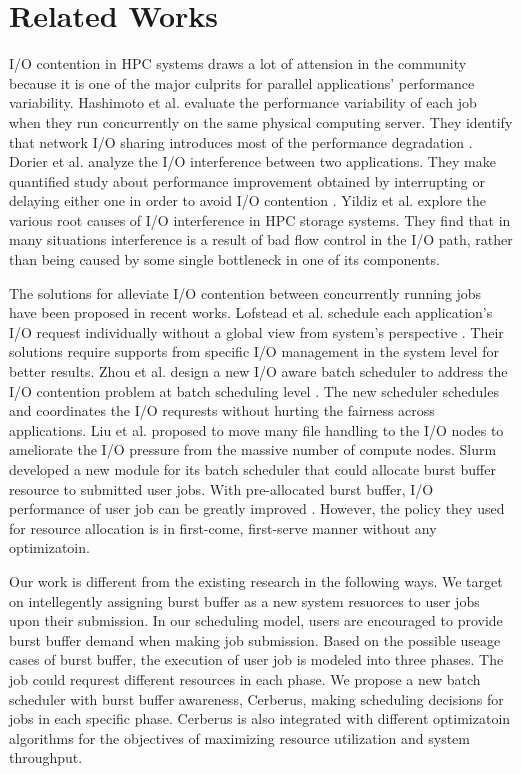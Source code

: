 \section{Related Works}
\label{Sec:RelatedWorks}

I/O contention in HPC systems draws a lot of attension in the community 
because it is one of the major culprits for parallel applications’ performance variability.
Hashimoto et al. evaluate the performance variability of each job 
when they run concurrently on the same physical computing server. 
They identify that network I/O sharing introduces most of 
the performance degradation \cite{hashimoto:ICNC:2012}.  
Dorier et al. analyze the I/O interference between two applications. 
They make quantified study about performance improvement obtained 
by interrupting or delaying either one in order to avoid I/O contention \cite{dorier:IPDPS:2014}.
Yildiz et al. \cite{yildiz:IPDPS:2016} explore the various root causes 
of I/O interference in HPC storage systems. 
They find that in many situations interference is a result of bad flow control in the I/O path, 
rather than being caused by some single bottleneck in one of its components.

The solutions for alleviate I/O contention between concurrently 
running jobs have been proposed in recent works.
Lofstead et al. schedule each application’s I/O request individually without 
a global view from system’s perspective \cite{lofstead:sc:2010}. 
Their solutions require supports from specific I/O management 
in the system level for better results. 
Zhou et al. design a new I/O aware batch scheduler to address the I/O 
contention problem at batch scheduling level \cite{zhou:Cluster:2015}. 
The new scheduler schedules and coordinates the 
I/O requrests without hurting the fairness across applications. 
Liu et al. proposed to move many file handling to the I/O nodes to 
ameliorate the I/O pressure from the massive number of compute nodes\cite{Liu:MSST:2012}.
Slurm developed a new module for its batch scheduler that could allocate burst buffer 
resource to submitted user jobs. With pre-allocated burst buffer, 
I/O performance of user job can be greatly improved \cite{SlurmBBGuide}.
However, the policy they used for resource allocation is in first-come, first-serve manner without any optimizatoin. 

Our work is different from the existing research in the following ways. 
We target on intellegently assigning burst buffer as a new system resuorces to user jobs
upon their submission.
In our scheduling model, users are encouraged to provide burst buffer demand
when making job submission.
Based on the possible useage cases of burst buffer, 
the execution of user job is modeled into three phases. 
The job could requrest different resources in each phase.
We propose a new batch scheduler with burst buffer awareness, Cerberus, 
making scheduling decisions for jobs in each specific phase.
Cerberus is also integrated with different optimizatoin algorithms 
for the objectives of maximizing resource utilization and system throughput.




